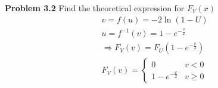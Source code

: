 \documentclass[journal,12pt,twocolumn]{IEEEtran}
\begin{document}
\textbf{Problem 3.2} Find the theoretical expression for $F_V(x)$\\
\solution
\begin{align}
    v = f(u) = -2\ln(1-U)\\
    u = f^{-1}(v) = 1-e^{-\frac{v}{2}}\\
    \Rightarrow F_V(v) = F_U(1-e^{-\frac{v}{2}})\\
    F_V(v) =
    \begin{cases}
        0 & v<0\\
        1-e^{-\frac{v}{2}} &v \geq 0
    \end{cases}
\end{align}
\end{document}
